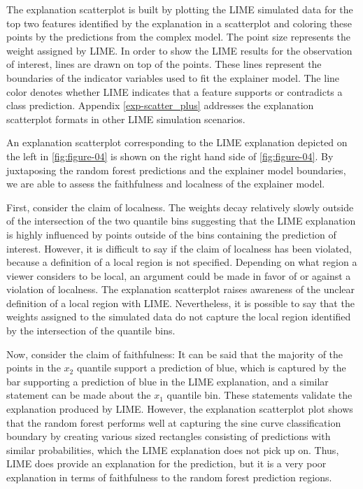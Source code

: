 \documentclass[AMS,STIX2COL]{WileyNJD-v2}\usepackage[]{graphicx}\usepackage[]{color}
\begin{document}
The explanation scatterplot is built by plotting the LIME simulated data for the top two features identified by the explanation in a scatterplot and coloring these points by the  predictions from the complex model. The point size  represents the weight assigned by LIME. In order to show the LIME results for the observation of interest, lines are drawn on top of the points. These lines  represent the boundaries of the indicator variables used to fit the explainer model. The line color  denotes whether LIME indicates that a feature supports or contradicts a class prediction. Appendix \ref{exp-scatter_plus} addresses the explanation scatterplot formats in other LIME simulation scenarios.

An explanation scatterplot corresponding to the LIME explanation depicted on the left in \autoref{fig:figure-04} is shown on the right hand side of \autoref{fig:figure-04}. By juxtaposing the random forest predictions and the explainer model boundaries, we are able to assess the faithfulness and localness of the explainer model. 

First, consider the claim of localness. The weights decay relatively slowly  outside of the intersection of the two quantile bins suggesting that the LIME explanation is highly influenced by points outside of the bins containing the prediction of interest. However, it is  difficult to say if the claim of localness has been violated, because a definition of a local region is not specified. Depending on what region a viewer considers to be local, an argument could be made in favor of or against a violation of localness. The explanation scatterplot raises awareness of the unclear definition of a local region with LIME. Nevertheless, it is possible to say that the weights assigned to the simulated data do not capture  the local region identified by the intersection of the quantile bins. 

Now, consider the claim of faithfulness: It can be said that the majority of the points in the $x_2$ quantile support a prediction of blue, which is captured by the bar supporting a prediction of blue in the LIME explanation, and a similar statement can be made about the $x_1$ quantile bin. These statements validate the explanation produced by LIME. However, the explanation scatterplot plot shows that the random forest performs well at capturing the sine curve classification boundary by creating various sized rectangles consisting of predictions with similar probabilities, which the LIME explanation does not pick up on. Thus, LIME does provide an explanation for the prediction, but it is a very poor explanation in terms of faithfulness to the random forest prediction regions.
\end{document}
